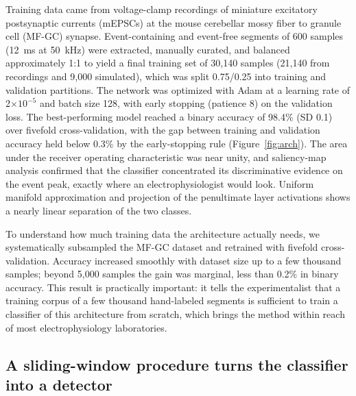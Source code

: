 \documentclass[11pt]{article}
\begin{document}
Training data came from voltage-clamp recordings of miniature excitatory
postsynaptic currents (mEPSCs) at the mouse cerebellar mossy fiber to granule
cell (MF-GC) synapse. Event-containing and event-free segments of 600 samples
(12~ms at 50~kHz) were extracted, manually curated, and balanced
approximately 1:1 to yield a final training set of 30{,}140 samples (21{,}140
from recordings and 9{,}000 simulated), which was split 0.75/0.25 into
training and validation partitions. The network was optimized with Adam
\citep{kingma2014adam} at a learning rate of 2$\times 10^{-5}$ and batch
size 128, with early stopping (patience 8) on the validation loss. The
best-performing model reached a binary accuracy of 98.4\% (SD 0.1) over
fivefold cross-validation, with the gap between training and validation
accuracy held below 0.3\% by the early-stopping rule
(Figure~\ref{fig:arch}). The area under the receiver operating characteristic
was near unity, and saliency-map analysis \citep{simonyan2013saliency}
confirmed that the classifier concentrated its discriminative evidence on the
event peak, exactly where an electrophysiologist would look. Uniform manifold
approximation and projection of the penultimate layer activations shows a
nearly linear separation of the two classes.

To understand how much training data the architecture actually needs, we
systematically subsampled the MF-GC dataset and retrained with fivefold
cross-validation. Accuracy increased smoothly with dataset size up to a few
thousand samples; beyond 5{,}000 samples the gain was marginal, less than
0.2\% in binary accuracy. This result is practically important: it tells the
experimentalist that a training corpus of a few thousand hand-labeled
segments is sufficient to train a classifier of this architecture from
scratch, which brings the method within reach of most electrophysiology
laboratories.

\subsection{A sliding-window procedure turns the classifier into a detector}
\end{document}
